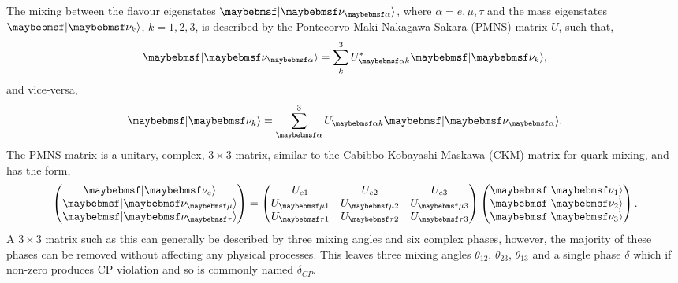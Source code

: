 The mixing between the flavour eigenstates $\ket{\nu_{\alpha}}$, where $\alpha=e,\mu,\tau$ and the
mass eigenstates $\ket{\nu_{k}}$, $k=1,2,3$, is described by the Pontecorvo-Maki-Nakagawa-Sakara
(PMNS) matrix $U$, such that,
\begin{equation} %
    \ket{\nu_{\alpha}}=\sum_{k}^{3}U_{\alpha k}^{*}\ket{\nu_{k}},
\end{equation} %
and vice-versa,
\begin{equation} %
    \ket{\nu_{k}}=\sum_{\alpha}^{3}U_{\alpha k}\ket{\nu_{\alpha}}.
\end{equation} %
The PMNS matrix is a unitary, complex, $3\times3$ matrix, similar to the Cabibbo-Kobayashi-Maskawa
(CKM) matrix for quark mixing, and has the form,
\begin{gather} %
    \begin{pmatrix}
        \ket{\nu_{e}}   \\
        \ket{\nu_{\mu}} \\
        \ket{\nu_{\tau}}
    \end{pmatrix}
    =
    \begin{pmatrix}
        U_{e1}     & U_{e2}     & U_{e3}     \\
        U_{\mu 1}  & U_{\mu 2}  & U_{\mu 3}  \\
        U_{\tau 1} & U_{\tau 2} & U_{\tau 3}
    \end{pmatrix}
    \begin{pmatrix}
        \ket{\nu_{1}} \\
        \ket{\nu_{2}} \\
        \ket{\nu_{3}}
    \end{pmatrix}.
\end{gather} %
A $3\times3$ matrix such as this can generally be described by three mixing angles and six complex
phases, however, the majority of these phases can be removed without affecting any physical
processes. This leaves three mixing angles $\theta_{12}$, $\theta_{23}$, $\theta_{13}$ and a
single phase $\delta$ which if non-zero produces CP violation and so is commonly named
$\delta_{CP}$.

